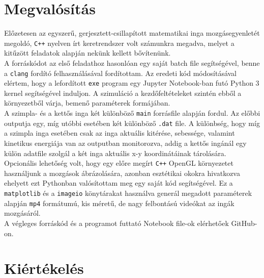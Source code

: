 \begin{multicols}{2}
\section{Megvalósítás} \label{sec:3}
Előzetesen az egyszerű, gerjesztett-csillapított matematikai inga mozgásegyenletét megoldó, \texttt{C++} nyelven írt keretrendszer volt számunkra megadva, melyet a kitűzött feladatok alapján nekünk kellett bővítenünk. \\
A forráskódot az első feladathoz hasonlóan egy saját batch file segítségével, benne a \texttt{clang} fordító felhasználásával fordítottam. Az eredeti kód módosításával elértem, hogy a lefordított \texttt{exe} program egy Jupyter Notebook-ban futó Python 3 kernel segítségével induljon. A szimuláció a kezdőfeltételeket szintén ebből a környezetből várja, bemenő paraméterek formájában. \\
A szimpla- és a kettős inga két különböző \texttt{main} forrásfile alapján fordul. Az előbbi outputja egy, míg utóbbi esetében két különböző \texttt{.dat} file. A különbség, hogy míg a szimpla inga esetében csak az inga aktuális kitérése, sebessége, valamint kinetikus energiája van az outputban monitorozva, addig a kettős ingánál egy külön adatfile szolgál a két inga aktuális x-y koordinátáinak tárolására. \\
Opcionális lehetőség volt, hogy egy előre megírt \texttt{C++} OpenGL környezetet használjunk a mozgások ábrázolására, azonban esztétikai okokra hivatkozva ehelyett ezt Pythonban valósítottam meg egy saját kód segítségével. Ez a \texttt{matplotlib} és a \texttt{imageio} könytárakat használva generál megadott paraméterek alapján \texttt{mp4} formátumú, kis méretű, de nagy felbontású videókat az ingák mozgásáról. \\
A végleges forráskód és a programot futtató Notebook file-ok elérhetőek GitHub-on\cite{github}.

\section{Kiértékelés} \label{sec:4}

\end{multicols}
